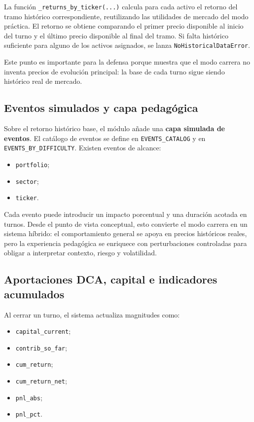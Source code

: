 La función \texttt{\_returns\_by\_ticker(...)} calcula para cada activo el retorno del tramo histórico correspondiente, reutilizando las utilidades de mercado del modo práctica. El retorno se obtiene comparando el primer precio disponible al inicio del turno y el último precio disponible al final del tramo. Si falta histórico suficiente para alguno de los activos asignados, se lanza \texttt{NoHistoricalDataError}.

Este punto es importante para la defensa porque muestra que el modo carrera no inventa precios de evolución principal: la base de cada turno sigue siendo histórico real de mercado.

\subsection{Eventos simulados y capa pedagógica}

Sobre el retorno histórico base, el módulo añade una \textbf{capa simulada de eventos}. El catálogo de eventos se define en \texttt{EVENTS\_CATALOG} y en \texttt{EVENTS\_BY\_DIFFICULTY}. Existen eventos de alcance:

\begin{itemize}
    \item \texttt{portfolio};
    \item \texttt{sector};
    \item \texttt{ticker}.
\end{itemize}

Cada evento puede introducir un impacto porcentual y una duración acotada en turnos. Desde el punto de vista conceptual, esto convierte el modo carrera en un sistema híbrido: el comportamiento general se apoya en precios históricos reales, pero la experiencia pedagógica se enriquece con perturbaciones controladas para obligar a interpretar contexto, riesgo y volatilidad.

\subsection{Aportaciones DCA, capital e indicadores acumulados}

Al cerrar un turno, el sistema actualiza magnitudes como:

\begin{itemize}
    \item \texttt{capital\_current};
    \item \texttt{contrib\_so\_far};
    \item \texttt{cum\_return};
    \item \texttt{cum\_return\_net};
    \item \texttt{pnl\_abs};
    \item \texttt{pnl\_pct}.
\end{itemize}

